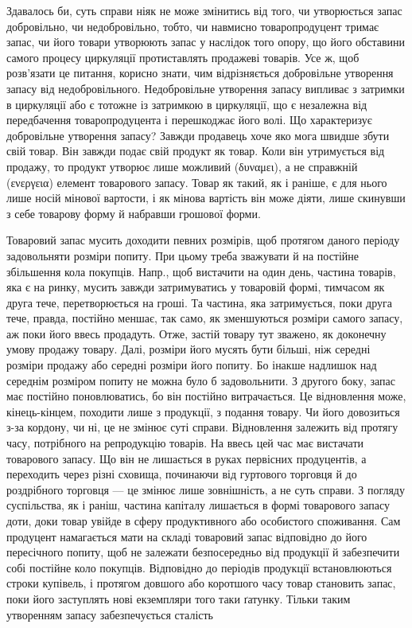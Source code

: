 Здавалось би, суть справи ніяк не може змінитись від того, чи утворюється
запас добровільно, чи недобровільно, тобто, чи навмисно товаропродуцент
тримає запас, чи його товари утворюють запас у наслідок того опору, що його
обставини самого процесу циркуляції протиставлять продажеві товарів. Усе
ж, щоб розв’язати це питання, корисно знати, чим відрізняється добровільне
утворення запасу від недобровільного. Недобровільне утворення запасу
випливає з затримки в циркуляції або є тотожне із затримкою в циркуляції,
що є незалежна від передбачення товаропродуцента і перешкоджає його
волі. Що характеризує добровільне утворення запасу? Завжди продавець
хоче яко мога швидше збути свій товар. Він завжди подає свій продукт як
товар. Коли він утримується від продажу, то продукт утворює лише можливий
(δυναμει), а не справжній (ενεργεια) елемент товарового запасу.
Товар як такий, як і раніше, є для нього лише носій мінової вартости,
і як мінова вартість він може діяти, лише скинувши з себе товарову
форму й набравши грошової форми.

Товаровий запас мусить доходити певних розмірів, щоб протягом
даного періоду задовольняти розміри попиту. При цьому треба зважувати
й на постійне збільшення кола покупців. Напр., щоб вистачити на один день,
частина товарів, яка є на ринку, мусить завжди затримуватись у товаровій
формі, тимчасом як друга тече, перетворюється на гроші. Та частина,
яка затримується, поки друга тече, правда, постійно меншає, так само,
як зменшуються розміри самого запасу, аж поки його ввесь продадуть.
Отже, застій товару тут зважено, як доконечну умову продажу
товару. Далі, розміри його мусять бути більші, ніж середні розміри
продажу або середні розміри його попиту. Бо інакше надлишок над
середнім розміром попиту не можна було б задовольнити. З другого боку,
запас має постійно поновлюватись, бо він постійно витрачається. Це
відновлення може, кінець-кінцем, походити лише з продукції, з подання
товару. Чи його довозиться з-за кордону, чи ні, це не змінює суті
справи. Відновлення залежить від протягу часу, потрібного на репродукцію
товарів. На ввесь цей час має вистачати товарового запасу. Що
він не лишається в руках первісних продуцентів, а переходить через різні
сховища, починаючи від гуртового торговця й до роздрібного торговця
— це змінює лише зовнішність, а не суть справи. З погляду суспільства,
як і раніш, частина капіталу лишається в формі товарового запасу доти,
доки товар увійде в сферу продуктивного або особистого споживання. Сам
продуцент намагається мати на складі товаровий запас відповідно до його
пересічного попиту, щоб не залежати безпосередньо від продукції й
забезпечити собі постійне коло покупців. Відповідно до періодів продукції
встановлюються строки купівель, і протягом довшого або коротшого
часу товар становить запас, поки його заступлять нові екземпляри того
таки ґатунку. Тільки таким утворенням запасу забезпечується сталість
\parbreak{}  %
